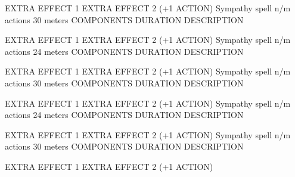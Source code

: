         EXTRA EFFECT 1
        EXTRA EFFECT 2 (+1 ACTION)
        {Sympathy spell}
        {n/m actions}
        {30 meters}
        {COMPONENTS}
        {DURATION}
        DESCRIPTION

        EXTRA EFFECT 1
        EXTRA EFFECT 2 (+1 ACTION)
        {Sympathy spell}
        {n/m actions}
        {24 meters}
        {COMPONENTS}
        {DURATION}
        DESCRIPTION

        EXTRA EFFECT 1
        EXTRA EFFECT 2 (+1 ACTION)
        {Sympathy spell}
        {n/m actions}
        {30 meters}
        {COMPONENTS}
        {DURATION}
        DESCRIPTION

        EXTRA EFFECT 1
        EXTRA EFFECT 2 (+1 ACTION)
        {Sympathy spell}
        {n/m actions}
        {24 meters}
        {COMPONENTS}
        {DURATION}
        DESCRIPTION

        EXTRA EFFECT 1
        EXTRA EFFECT 2 (+1 ACTION)
        {Sympathy spell}
        {n/m actions}
        {30 meters}
        {COMPONENTS}
        {DURATION}
        DESCRIPTION

        EXTRA EFFECT 1
        EXTRA EFFECT 2 (+1 ACTION)
